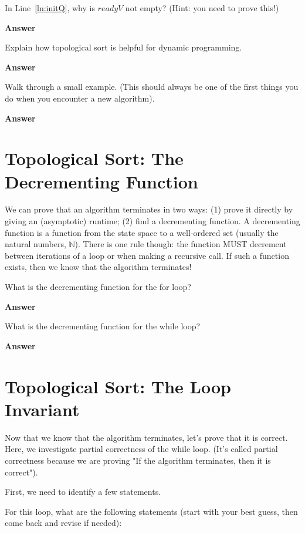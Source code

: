 \documentclass{article}
\def\N{{\mathbb N}}
\begin{document}
\pagebreak
In Line~\ref{ln:initQ}, why is $readyV$ not empty? (Hint: you need to prove
this!)

\textbf{Answer}
\vspace{1in}

Explain how topological sort is helpful for dynamic programming.

\textbf{Answer}
\vspace{1in}

Walk through a small example. (This should always be one of the first things you
do when you encounter a new algorithm).

\textbf{Answer}

\pagebreak
\section*{Topological Sort: The Decrementing Function}

We can prove that an algorithm terminates in two ways: (1) prove it directly by
giving an (asymptotic) runtime; (2) find a decrementing function.  A
decrementing function is a function from the state space to a well-ordered set
(usually the natural numbers, $\N$).  There is one rule though: the function
MUST decrement between iterations of a loop or when making a recursive call. If
such a function exists, then we know that the algorithm terminates!

What is the decrementing function for the for loop?

\textbf{Answer}
\vspace{1in}

What is the decrementing function for the while loop?

\textbf{Answer}
\vspace{1in}

\section*{Topological Sort: The Loop Invariant}

Now that we know that the algorithm terminates, let's prove that it is correct.
Here, we investigate partial correctness of the while loop. (It's called partial
correctness because we are proving "If the algorithm terminates, then it is
correct").

First, we need to identify a few statements.

For this loop, what
are the following statements (start with your best guess, then come back and
revise if needed):
\end{document}
